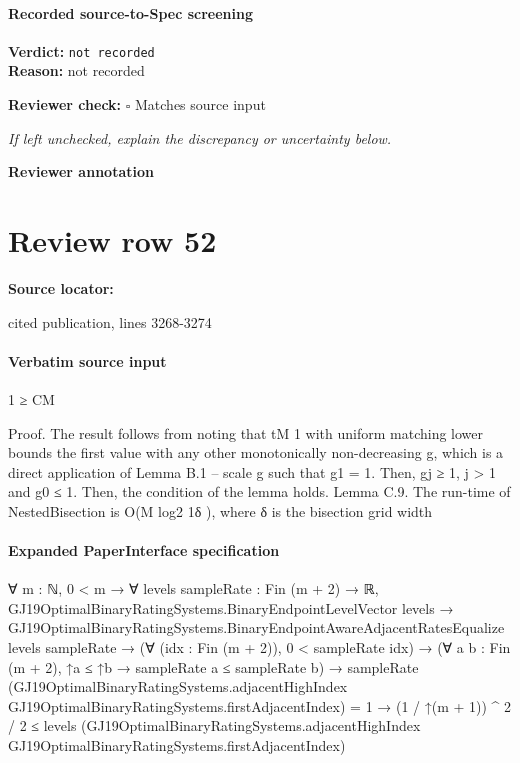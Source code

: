 \documentclass[10pt]{article}
\newcommand{\reviewerbox}{%
  \par\noindent\fbox{\parbox{0.96\linewidth}{\rule{0pt}{0.38in}}}\par
}
\newcommand{\reviewmatch}[1]{%
  \par\noindent\textbf{Reviewer check:} $\square$\; #1\par
  \noindent\emph{If left unchecked, explain the discrepancy or uncertainty below.}\par
}
\begin{document}
\paragraph{Recorded source-to-Spec screening}
\textbf{Verdict:} \texttt{not recorded}
\\
\textbf{Reason:} not recorded
\reviewmatch{Matches source input}
\noindent\textbf{Reviewer annotation}\par
\reviewerbox
\clearpage
\hypertarget{source-claim-d7f37d83d608e4fa}{}
\section*{Review row 52}
\textbf{Source locator:} {\footnotesize\raggedright cited publication, lines 3268-\allowbreak{}3274\par}
\paragraph{Verbatim source input}
\begin{ReviewVerbatim}
1 ≥ CM

Proof. The result follows from noting that tM
1 with uniform matching lower bounds the first value
with any other monotonically non-decreasing g, which is a direct application of Lemma B.1 – scale
g such that g1 = 1. Then, gj ≥ 1, j > 1 and g0 ≤ 1. Then, the condition of the lemma holds.
Lemma C.9. The run-time of NestedBisection is O(M log2 1δ ), where δ is the bisection grid width
\end{ReviewVerbatim}


\paragraph{Expanded PaperInterface specification}
\begin{ReviewVerbatim}
∀ {m : ℕ},
  0 < m →
    ∀ {levels sampleRate : Fin (m + 2) → ℝ},
      GJ19OptimalBinaryRatingSystems.BinaryEndpointLevelVector levels →
        GJ19OptimalBinaryRatingSystems.BinaryEndpointAwareAdjacentRatesEqualize levels sampleRate →
          (∀ (idx : Fin (m + 2)), 0 < sampleRate idx) →
            (∀ {a b : Fin (m + 2)}, ↑a ≤ ↑b → sampleRate a ≤ sampleRate b) →
              sampleRate
                    (GJ19OptimalBinaryRatingSystems.adjacentHighIndex
                      GJ19OptimalBinaryRatingSystems.firstAdjacentIndex) =
                  1 →
                (1 / ↑(m + 1)) ^ 2 / 2 ≤
                  levels
                    (GJ19OptimalBinaryRatingSystems.adjacentHighIndex GJ19OptimalBinaryRatingSystems.firstAdjacentIndex)
\end{ReviewVerbatim}
\end{document}
